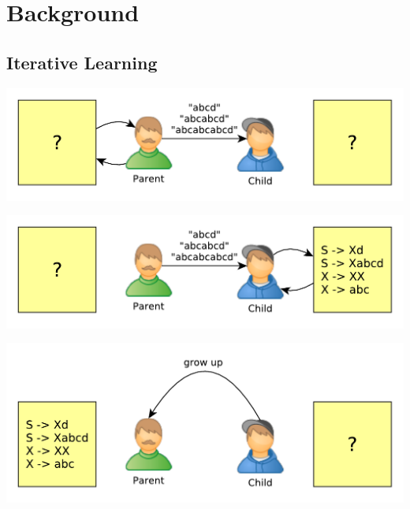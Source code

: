 \documentclass[11pt,a4paper,xcolor=dvipsnames]{beamer}
\begin{document}
\section{Background}
\subsection{Iterative Learning}
\begin{frame}
  \begin{center}
    \includegraphics[scale=0.6]{assets/iterative1.pdf}
  \end{center}
\end{frame}

\begin{frame}
  \begin{center}
    \includegraphics[scale=0.6]{assets/iterative2.pdf}
  \end{center}
\end{frame}

\begin{frame}
  \begin{center}
    \includegraphics[scale=0.6]{assets/iterative3.pdf}
  \end{center}
\end{frame}
\end{document}

